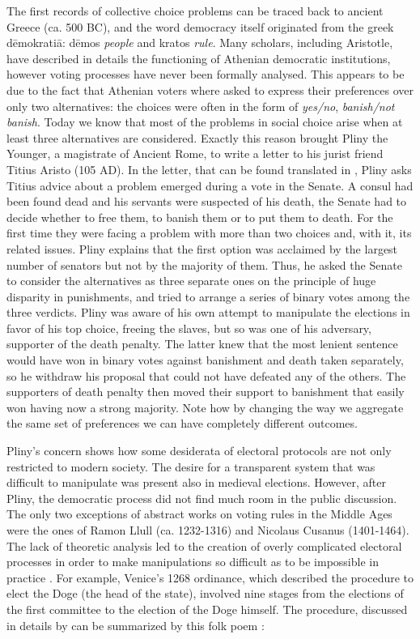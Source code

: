 The first records of collective choice problems can be traced back to ancient Greece (ca. 500 BC), and the word democracy itself originated from the greek dēmokratiā: dēmos \textit{people} and kratos \textit{rule}. Many scholars, including Aristotle, have described in details the functioning of Athenian democratic institutions, however voting processes have never been formally analysed. This appears to be due to the fact that Athenian voters where asked to express their preferences over only two alternatives: the choices were often in the form of \textit{yes/no}, \textit{banish/not banish}. Today we know that most of the problems in social choice arise when at least three alternatives are considered. Exactly this reason brought Pliny the Younger, a magistrate of Ancient Rome, to write a letter to his jurist friend Titius Aristo (105 AD). In the letter, that can be found translated in \citet[Chapter 2]{McLeanUrken1995}, Pliny asks Titius advice about a problem emerged during a vote in the Senate. A consul had been found dead and his servants were suspected of his death, the Senate had to decide whether to free them, to banish them or to put them to death. For the first time they were facing a problem with more than two choices and, with it, its related issues. Pliny explains that the first option was acclaimed by the largest number of senators but not by the majority of them. Thus, he asked the Senate to consider the alternatives as three separate ones on the principle of huge disparity in punishments, and tried to arrange a series of binary votes among the three verdicts. Pliny was aware of his own attempt to manipulate the elections in favor of his top choice, freeing the slaves, but so was one of his adversary, supporter of the death penalty. The latter knew that the most lenient sentence would have won in binary votes against banishment and death taken separately, so he withdraw his proposal that could not have defeated any of the others. The supporters of death penalty then moved their support to banishment that easily won having now a strong majority. Note how by changing the way we aggregate the same set of preferences we can have completely different outcomes.

Pliny's concern shows how some desiderata of electoral protocols are not only restricted to modern society. The desire for a transparent system that was difficult to manipulate was present also in medieval elections. However, after Pliny, the democratic process did not find much room in the public discussion. The only two exceptions of abstract works on voting rules in the Middle Ages were the ones of Ramon Llull (ca. 1232-1316) and Nicolaus Cusanus (1401-1464). The lack of theoretic analysis led to the creation of overly complicated electoral processes in order to make manipulations so difficult as to be impossible in practice \citep{Uckelman2010}. For example, Venice's 1268 ordinance, which described the procedure to elect the Doge (the head of the state), involved nine stages from the elections of the first committee to the election of the Doge himself. The procedure, discussed in details by \citet{Lines1986, Coggins1998, Mowbray2007} can be summarized by this folk poem \citep{Doglioni1666}:

